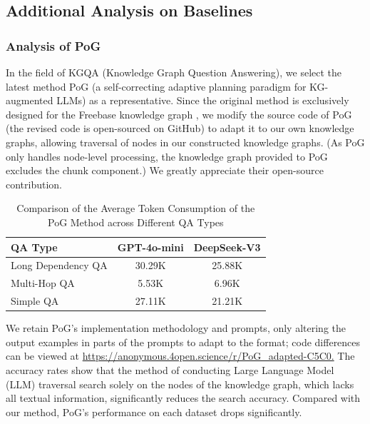 \subsection{Additional Analysis on Baselines}
\label{appendix::supplementary-experimental-details}


\subsubsection{Analysis of PoG}
\label{appendix:::some-details-of-PoG}
In the field of KGQA (Knowledge Graph Question Answering), we select the latest method PoG (a self-correcting adaptive planning paradigm for KG-augmented LLMs) as a representative. Since the original method is exclusively designed for the Freebase knowledge graph \cite{freebase}, we modify the source code of PoG (the revised code is open-sourced on GitHub) to adapt it to our own knowledge graphs, allowing traversal of nodes in our constructed knowledge graphs. (As PoG only handles node-level processing, the knowledge graph provided to PoG excludes the chunk component.) We greatly appreciate their open-source contribution.

\begin{table} 
\centering
\begin{tabular}{l|c|c}
\toprule
\textbf{QA Type} & \textbf{GPT-4o-mini} & \textbf{DeepSeek-V3} \\ 
\midrule
Long Dependency QA & 30.29K & 25.88K \\
Multi-Hop QA       & 5.53K & 6.96K \\
Simple QA          & 27.11K & 21.21K \\
\bottomrule
\end{tabular}
\vspace{0.5em} 
\caption{Comparison of the Average Token Consumption of the PoG Method across Different QA Types}
\label{tab:token_consumption}
\end{table}

We retain PoG's implementation methodology and prompts, only altering the output examples in parts of the prompts to adapt to the format; code differences can be viewed at \url{https://anonymous.4open.science/r/PoG_adapted-C5C0.} The accuracy rates show that the method of conducting Large Language Model (LLM) traversal search solely on the nodes of the knowledge graph, which lacks all textual information, significantly reduces the search accuracy. Compared with our method, PoG’s performance on each dataset drops significantly.

